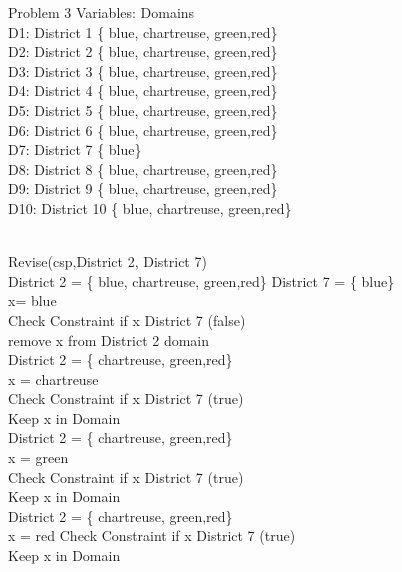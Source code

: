 \documentclass{article}
\begin{document}
Problem 3
Variables:      Domains\\
D1: District 1 \left\{ {blue, chartreuse, green,red}\right\} \\
D2: District 2 \left\{ {blue, chartreuse, green,red}\right\} \\
D3: District 3 \left\{ {blue, chartreuse, green,red}\right\} \\
D4: District 4 \left\{ {blue, chartreuse, green,red}\right\} \\
D5: District 5 \left\{ {blue, chartreuse, green,red}\right\} \\
D6: District 6 \left\{ {blue, chartreuse, green,red}\right\} \\
D7: District 7 \left\{ {blue}\right\} \\
D8: District 8 \left\{ {blue, chartreuse, green,red}\right\} \\
D9: District 9 \left\{ {blue, chartreuse, green,red}\right\} \\
D10: District 10 \left\{ {blue, chartreuse, green,red}\right\} \\
\\

\begin{p3}
Revise(csp,District 2, District 7)\\
District 2 = \left\{ {blue, chartreuse, green,red}\right\} District 7 = \left\{ {blue}\right\} \\
x= blue \\
Check Constraint if x \ne District 7 (false)\\
remove x from District 2 domain \\
District 2 = \left\{ {chartreuse, green,red}\right\} \\
x = chartreuse \\
Check Constraint if x \ne District 7 (true)\\
Keep x in Domain \\
District 2 = \left\{ {chartreuse, green,red}\right\} \\
x = green \\
Check Constraint if x \ne District 7 (true)\\
Keep x in Domain \\
District 2 = \left\{ {chartreuse, green,red}\right\} \\
x = red
Check Constraint if x \ne District 7 (true)\\
Keep x in Domain \\
\end{p3}
\vspace{4mm}
\end{document}
